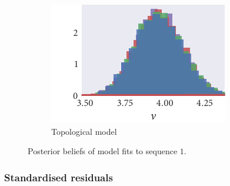\begin{figure}[p]
\begin{subfigure}[b]{\textwidth}
    \includegraphics{seq1/top_hist_nu.pdf}%
    \caption{Topological model}
  \end{subfigure}
  \caption{Posterior beliefs of model fits to sequence $1$.}
\end{figure}

\subsubsection{Standardised residuals}

